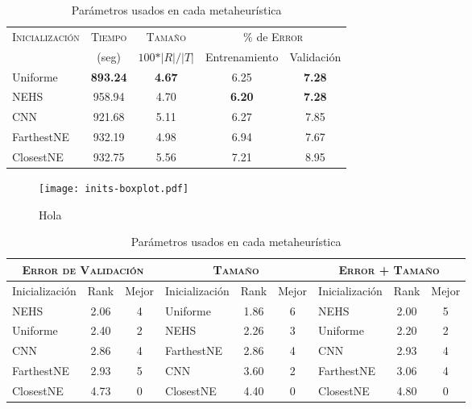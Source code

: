 \begin{table}[h!]
\centering
\begin{tabular}{l c c c c}
\hline
\multirow{2}{*}{\textsc{Inicialización}}
	& \textsc{Tiempo} & \textsc{Tamaño}
	& \multicolumn{2}{c}{$\%$ de \textsc{Error}} \\\cline{4-5}
 & \scriptsize{(seg)} & \scriptsize{$100*\vert R \vert / \vert T \vert$}
	& \scriptsize{Entrenamiento} & \scriptsize{Validación} \\
\hline
\hline
Uniforme   & \textbf{893.24} & \textbf{4.67} & 6.25 & \textbf{7.28} \\
NEHS       & 958.94 & 4.70 & \textbf{6.20} & \textbf{7.28} \\
CNN        & 921.68 & 5.11 & 6.27 & 7.85 \\
FarthestNE & 932.19 & 4.98 & 6.94 & 7.67 \\
ClosestNE  & 932.75 & 5.56 & 7.21 & 8.95 \\
\hline
\end{tabular}
\caption{Parámetros usados en cada metaheurística}
\label{table-inits}
\end{table}

\begin{figure}[h!]
\centering
\texttt{[image: inits-boxplot.pdf]}
\caption{Hola}
\label{fig-inits}
\end{figure}

\blindtext

\begin{table}[h!]
\centering
\begin{tabular}{l c c|l c c|l c c}
\hline
\multicolumn{3}{c|}{\textsc{Error de Validación}}
	& \multicolumn{3}{c|}{\textsc{Tamaño}}
	& \multicolumn{3}{c}{\textsc{Error + Tamaño}} \\
\hline
Inicialización & Rank & Mejor & Inicialización & Rank & Mejor & Inicialización & Rank & Mejor \\
\hline
\hline
NEHS       & 2.06 & 4 & Uniforme   & 1.86 & 6 & NEHS       & 2.00 & 5 \\
Uniforme   & 2.40 & 2 & NEHS       & 2.26 & 3 & Uniforme   & 2.20 & 2 \\
CNN        & 2.86 & 4 & FarthestNE & 2.86 & 4 & CNN        & 2.93 & 4 \\
FarthestNE & 2.93 & 5 & CNN        & 3.60 & 2 & FarthestNE & 3.06 & 4 \\
ClosestNE  & 4.73 & 0 & ClosestNE  & 4.40 & 0 & ClosestNE  & 4.80 & 0 \\
\hline
\end{tabular}
\caption{Parámetros usados en cada metaheurística}
\label{table-inits-rank}
\end{table}

